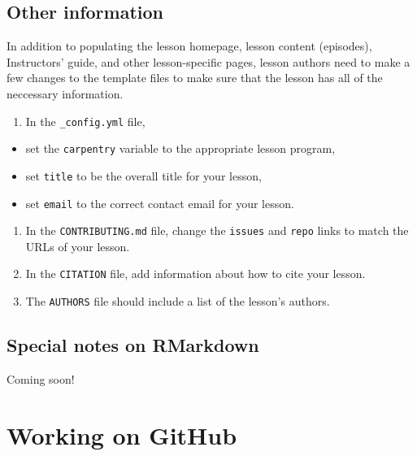 \documentclass[]{book}
\providecommand{\tightlist}{%
  \setlength{\itemsep}{0pt}\setlength{\parskip}{0pt}}
\begin{document}
\hypertarget{other-information}{%
\subsection{Other information}\label{other-information}}

In addition to populating the lesson homepage, lesson content (episodes),
Instructors' guide, and other lesson-specific
pages, lesson authors need to make a few changes to the template
files to make sure that the lesson has all of the neccessary
information.

\begin{enumerate}
\def\labelenumi{\arabic{enumi}.}
\tightlist
\item
  In the \texttt{\_config.yml} file,
\end{enumerate}

\begin{itemize}
\tightlist
\item
  set the \texttt{carpentry} variable to the appropriate lesson program,
\item
  set \texttt{title} to be the overall title for your lesson,
\item
  set \texttt{email} to the correct contact email for your lesson.
\end{itemize}

\begin{enumerate}
\def\labelenumi{\arabic{enumi}.}
\item
  In the \texttt{CONTRIBUTING.md} file, change the \texttt{issues} and \texttt{repo} links to match the URLs of your lesson.
\item
  In the \texttt{CITATION} file, add information about how to cite your lesson.
\item
  The \texttt{AUTHORS} file should include a list of the lesson's authors.
\end{enumerate}

\hypertarget{special-notes-on-rmarkdown}{%
\subsection{Special notes on RMarkdown}\label{special-notes-on-rmarkdown}}

Coming soon!

\hypertarget{working-on-github}{%
\section{Working on GitHub}\label{working-on-github}}
\end{document}
